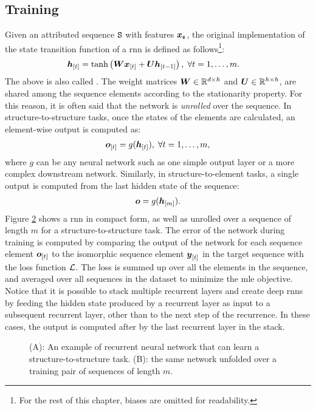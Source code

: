\subsection{Training}
Given an attributed sequence $\mathtt{S}$ with features $\Vector{x}_{\Seq{s}}$, the original implementation of the state transition function of a \gls{rnn} is defined as follows\footnote{For the rest of this chapter, biases are omitted for readability.}:
\begin{align*}
    \Elem{h}{t} &= \tanh\Par{\Matrix{W}\Elem{x}{t} + \Matrix{U}\Elem{h}{t-1}},\; \forall t=1, \ldots, m.
\end{align*}
The above is also called . The weight matrices $\Matrix{W} \in \Real^{d \times h}$ and $\Matrix{U} \in \Real^{h \times h}$, are shared among the sequence elements according to the stationarity property. For this reason, it is often said that the network is \emph{unrolled} over the sequence. In structure-to-structure tasks, once the states of the elements are calculated, an element-wise output is computed as:
\begin{align*}
    \Elem{o}{t} = g(\Elem{h}{t}),\; \forall t=1, \ldots, m,
\end{align*}
where $g$ can be any neural network such as one simple output layer or a more complex downstream network. Similarly, in structure-to-element tasks, a single output is computed from the last hidden state of the sequence:
\begin{align*}
    \Vector{o} = g(\Elem{h}{m}).
\end{align*}
Figure \ref{fig:rnn-unfold} shows a \gls{rnn} in compact form, as well as unrolled over a sequence of length $m$ for a structure-to-structure task. The error of the network during training is computed by comparing the output of the network for each sequence element $\Elem{o}{t}$ to the isomorphic sequence element $\Elem{y}{t}$ in the target sequence with the loss function $\mathcal{L}$. The loss is summed up over all the elements in the sequence, and averaged over all sequences in the dataset to minimize the \gls{mle} objective. Notice that it is possible to stack multiple recurrent layers and create deep \glspl{rnn} by feeding the hidden state produced by a recurrent layer as input to a subsequent recurrent layer, other than to the next step of the recurrence. In these cases, the output is computed after by the last recurrent layer in the stack.
\begin{figure*}[h!]
    \begin{subfigure}[b]{0.39\linewidth}
        \centering
        \resizebox{.7\textwidth}{!}{}
        \caption{}
        \label{fig:rnn}
    \end{subfigure}
    \begin{subfigure}[b]{0.59\linewidth}
        \centering
        \resizebox{.8\textwidth}{!}{}
        \caption{}
        \label{fig:rnn-unfold}
    \end{subfigure}
    \caption{({\scriptsize A}): An example of recurrent neural network that can learn a structure-to-structure task. ({\scriptsize B}): the same network unfolded over a training pair of sequences of length $m$.}
    \label{fig:rnn-example}
\end{figure*}
